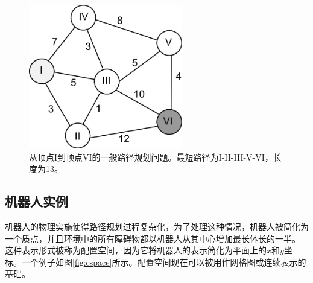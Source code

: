 \begin{figure}[!htb]
\centering
\includegraphics[width=0.6\textwidth]{figs/dijkstra}
\caption{从顶点I到顶点VI的一般路径规划问题。最短路径为I-II-III-V-VI，长度为13。} 
\label{fig:pathproblem}
\end{figure}

\subsection{机器人实例}

机器人的物理实施使得路径规划过程复杂化，为了处理这种情况，机器人被简化为一个质点，并且环境中的所有障碍物都以机器人从其中心增加最长体长的一半。 这种表示形式被称为配置空间，因为它将机器人的表示简化为平面上的$x$和$y$坐标。一个例子如图\ref{fig:cspace}所示。配置空间现在可以被用作网格图或连续表示的基础。

